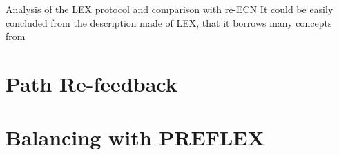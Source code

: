 Analysis of the LEX protocol and comparison with re-ECN
It could be easily concluded from the description made of LEX, that it borrows  many concepts from 
\section{Path Re-feedback}
\section{Balancing with PREFLEX}